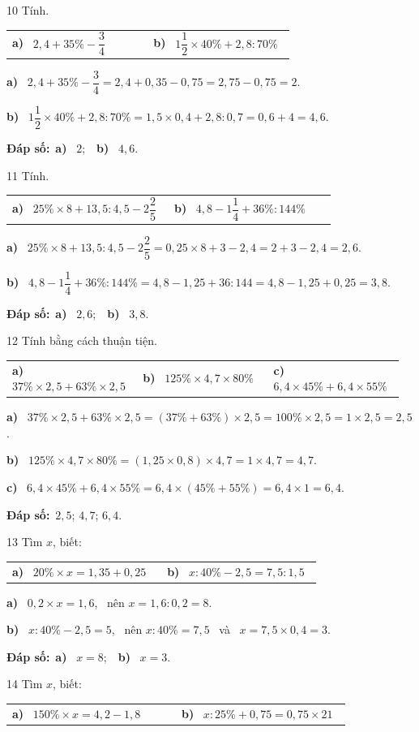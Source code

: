 \documentclass[11pt]{article}
\makeatletter
\newif\ifsol \solfalse
\renewcommand{\arraystretch}{1.35}
\providecommand{\AnsWord}{Đáp số}
\newcommand{\dapso}[1]{\par\textbf{\AnsWord:}\ #1}
\newcommand{\probsol}[1]{%
  \begin{lrbox}{\solmeasure}\begin{minipage}{\dimexpr\linewidth-24pt\relax}#1\end{minipage}\end{lrbox}%
  \ifsol
    \begin{solbox}#1\end{solbox}%
  \else
    \setlength{\solht}{\dimexpr\ht\solmeasure+\dp\solmeasure+0.85cm\relax}%
    \ifdim\solht<1.35cm\setlength{\solht}{1.35cm}\fi
    \begin{tcolorbox}[colback=white,colframe=Line,boxrule=0.8pt,arc=5pt,
      left=8pt,right=8pt,top=4pt,bottom=4pt,height=\solht]{\footnotesize\color{Slate}\itshape\WorkWord}\end{tcolorbox}%
  \fi}
\newcommand{\pa}[1]{\textbf{#1)}\ }
\newenvironment{cols2}{\par\vspace{3pt}\noindent\setlength{\tabcolsep}{0pt}\renewcommand{\arraystretch}{1.3}%
  \begin{tabular}{@{}>{\raggedright\arraybackslash\rule{0pt}{4.4ex}}p{0.48\linewidth}<{\rule[-2.3ex]{0pt}{0pt}}@{\hspace{0.03\linewidth}}>{\raggedright\arraybackslash\rule{0pt}{4.4ex}}p{0.48\linewidth}<{\rule[-2.3ex]{0pt}{0pt}}@{}}}%
  {\end{tabular}\par}
\newenvironment{cols3}{\par\vspace{3pt}\noindent\setlength{\tabcolsep}{0pt}\renewcommand{\arraystretch}{1.3}%
  \begin{tabular}{@{}>{\raggedright\arraybackslash\rule{0pt}{4.4ex}}p{0.32\linewidth}<{\rule[-2.3ex]{0pt}{0pt}}@{\hspace{0.015\linewidth}}>{\raggedright\arraybackslash\rule{0pt}{4.4ex}}p{0.32\linewidth}<{\rule[-2.3ex]{0pt}{0pt}}@{\hspace{0.015\linewidth}}>{\raggedright\arraybackslash\rule{0pt}{4.4ex}}p{0.32\linewidth}<{\rule[-2.3ex]{0pt}{0pt}}@{}}}%
  {\end{tabular}\par}
\newcommand{\gap}{\vspace{0.3cm}}
\def\WorkWord{Bài làm:}
\def\AnsWord{Đáp số}
\makeatother
\begin{document}
\gap
\begin{probbox}{10}{\relax}
Tính.
\begin{cols2}
\pa{a} $2{,}4+35\%-\dfrac34$ & \pa{b} $1\dfrac12\times40\%+2{,}8:70\%$
\end{cols2}
\end{probbox}
\probsol{
\pa{a} $2{,}4+35\%-\dfrac34=2{,}4+0{,}35-0{,}75=2{,}75-0{,}75=2$.\par
\pa{b} $1\dfrac12\times40\%+2{,}8:70\%=1{,}5\times0{,}4+2{,}8:0{,}7=0{,}6+4=4{,}6$.
\dapso{\pa{a} $2$;\ \ \pa{b} $4{,}6$.}}
\gap
\begin{probbox}{11}{\relax}
Tính.
\begin{cols2}
\pa{a} $25\%\times8+13{,}5:4{,}5-2\dfrac25$ & \pa{b} $4{,}8-1\dfrac14+36\%:144\%$
\end{cols2}
\end{probbox}
\probsol{
\pa{a} $25\%\times8+13{,}5:4{,}5-2\dfrac25=0{,}25\times8+3-2{,}4=2+3-2{,}4=2{,}6$.\par
\pa{b} $4{,}8-1\dfrac14+36\%:144\%=4{,}8-1{,}25+36:144=4{,}8-1{,}25+0{,}25=3{,}8$.
\dapso{\pa{a} $2{,}6$;\ \ \pa{b} $3{,}8$.}}
\gap
\begin{probbox}{12}{\relax}
Tính bằng cách thuận tiện.
\begin{cols3}
\pa{a} $37\%\times2{,}5+63\%\times2{,}5$ & \pa{b} $125\%\times4{,}7\times80\%$ & \pa{c} $6{,}4\times45\%+6{,}4\times55\%$
\end{cols3}
\end{probbox}
\probsol{
\pa{a} $37\%\times2{,}5+63\%\times2{,}5=(37\%+63\%)\times2{,}5=100\%\times2{,}5=1\times2{,}5=2{,}5$.\par
\pa{b} $125\%\times4{,}7\times80\%=(1{,}25\times0{,}8)\times4{,}7=1\times4{,}7=4{,}7$.\par
\pa{c} $6{,}4\times45\%+6{,}4\times55\%=6{,}4\times(45\%+55\%)=6{,}4\times1=6{,}4$.
\dapso{$2{,}5$; $4{,}7$; $6{,}4$.}}
\gap
\begin{probbox}{13}{\relax}
Tìm $x$, biết:
\begin{cols2}
\pa{a} $20\%\times x=1{,}35+0{,}25$ & \pa{b} $x:40\%-2{,}5=7{,}5:1{,}5$
\end{cols2}
\end{probbox}
\probsol{
\pa{a} $0{,}2\times x=1{,}6$, \ nên $x=1{,}6:0{,}2=8$.\par
\pa{b} $x:40\%-2{,}5=5$, \ nên $x:40\%=7{,}5$ \ và \ $x=7{,}5\times0{,}4=3$.
\dapso{\pa{a} $x=8$;\ \ \pa{b} $x=3$.}}
\gap
\begin{probbox}{14}{\relax}
Tìm $x$, biết:
\begin{cols2}
\pa{a} $150\%\times x=4{,}2-1{,}8$ & \pa{b} $x:25\%+0{,}75=0{,}75\times21$
\end{cols2}
\end{probbox}
\end{document}
